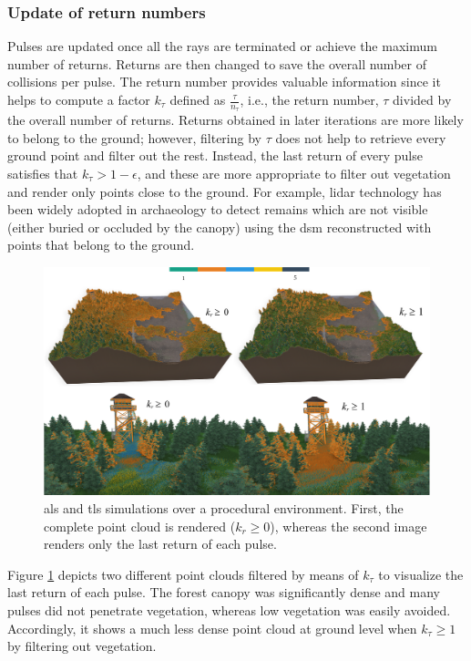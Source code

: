 \subsubsection{Update of return numbers}

Pulses are updated once all the rays are terminated or achieve the maximum number of returns. Returns are then changed to save the overall number of collisions per pulse. The return number provides valuable information since it helps to compute a factor $k_{\tau}$ defined as $\frac{\tau}{n_{\tau}}$, i.e., the return number, $\tau$ divided by the overall number of returns. Returns obtained in later iterations are more likely to belong to the ground; however, filtering by $\tau$ does not help to retrieve every ground point and filter out the rest. Instead, the last return of every pulse satisfies that $k_{\tau} > 1 - \epsilon$, and these are more appropriate to filter out vegetation and render only points close to the ground. For example, \acrshort{lidar} technology has been widely adopted in archaeology to detect remains which are not visible (either buried or occluded by the canopy) using the \acrshort{dsm} reconstructed with points that belong to the ground. 

\begin{figure}[ht]
	\centering
	\includegraphics[width=1\linewidth]{figs/lidar_simulation/tls_multiple_returns.png}
	\caption{\acrshort{als} and \acrshort{tls} simulations over a procedural environment. First, the complete point cloud is rendered ($k_{r} \geq 0$), whereas the second image renders only the last return of each pulse.}
	\label{fig:multiple_returns}
\end{figure}

Figure \ref{fig:multiple_returns} depicts two different point clouds filtered by means of $k_{\tau}$ to visualize the last return of each pulse. The forest canopy was significantly dense and many pulses did not penetrate vegetation, whereas low vegetation was easily avoided. Accordingly, it shows a much less dense point cloud at ground level when $k_{\tau} \geq 1$ by filtering out vegetation.

